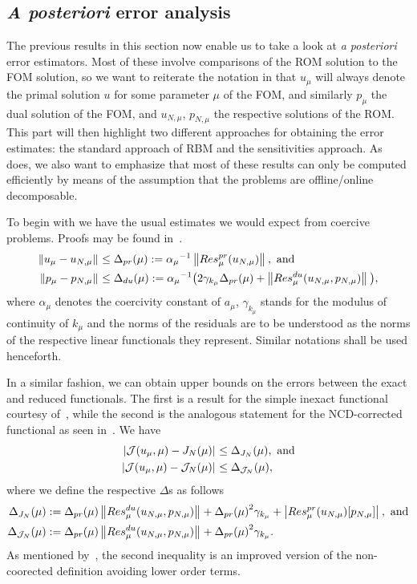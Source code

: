 \subsection{\textit{A posteriori} error analysis}

The previous results in this section now enable us to take a look at \textit{a posteriori} error estimators.
Most of these involve comparisons of the ROM solution to the FOM solution, so we want to reiterate the notation in that $u_\mu$ will always denote the primal solution $u$ for some parameter $\mu$ of the FOM, and similarly $p_\mu$ the dual solution of the FOM, and $u_{N, \mu}$, $p_{N, \mu}$ the respective solutions of the ROM.\@
This part will then highlight two different approaches for obtaining the error estimates: the standard approach of RBM and the sensitivities approach.
As~\cite{Keil2021} does, we also want to emphasize that most of these results can only be computed efficiently by means of the assumption that the problems are offline/online decomposable.

To begin with we have the usual estimates we would expect from coercive problems.
Proofs may be found in~\cite{Rozza2008, Qian2017}.
\begin{align*}
    \left\lVert u_\mu - u_{N, \mu}\right\rVert_{} &\leq \Delta_{pr}(\mu) := {\alpha_\mu}^{-1} \left\lVert Res_\mu^{pr}(u_{N, \mu})\right\rVert_{}, \text{ and} \\
    \left\lVert p_\mu - p_{N, \mu}\right\rVert_{} &\leq \Delta_{du}(\mu) := {\alpha_\mu}^{-1} \big( 2 \gamma_{k_\mu} \Delta_{pr}(\mu) + \left\lVert Res_\mu^{du}(u_{N, \mu}, p_{N, \mu})\right\rVert_{} \big),
\end{align*}
where $\alpha_\mu$ denotes the coercivity constant of $a_\mu$, $\gamma_{k_\mu}$ stands for the modulus of continuity of $k_\mu$ and the norms of the residuals are to be understood as the norms of the respective linear functionals they represent.
Similar notations shall be used henceforth.

In a similar fashion, we can obtain upper bounds on the errors between the exact and reduced functionals.
The first is a result for the simple inexact functional courtesy of~\cite[Theorem 4]{Qian2017}, while the second is the analogous statement for the NCD-corrected functional as seen in~\cite[Proposition 3.6]{Keil2021}.
We have
\begin{align*}
    \left\lvert\mathcal{J}(u_\mu, \mu) - J_N(\mu)\right\rvert_{} &\leq \Delta_{J_N}(\mu), \text{ and} \\
    \left\lvert\mathcal{J}(u_\mu, \mu) - \mathcal{J}_N(\mu)\right\rvert_{} &\leq \Delta_{\mathcal{J}_N}(\mu),
\end{align*}
where we define the respective $\Delta$s as follows
\begin{align*}
    \Delta_{J_N}(\mu) &:= \Delta_{pr}(\mu) \left\lVert Res_\mu^{du}(u_{N, \mu}, p_{N, \mu})\right\rVert_{} + {\Delta_{pr}(\mu)}^2 \gamma_{k_\mu} + \left\lvert Res_\mu^{pr}(u_{N, \mu})[p_{N, \mu}]\right\rvert_{}, \text{ and} \\
    \Delta_{\mathcal{J}_N}(\mu) &:= \Delta_{pr}(\mu) \left\lVert Res_\mu^{du}(u_{N, \mu}, p_{N, \mu})\right\rVert_{} + {\Delta_{pr}(\mu)}^2 \gamma_{k_\mu}.
\end{align*}
As mentioned by~\cite{Keil2021}, the second inequality is an improved version of the non-coorected definition avoiding lower order terms.

